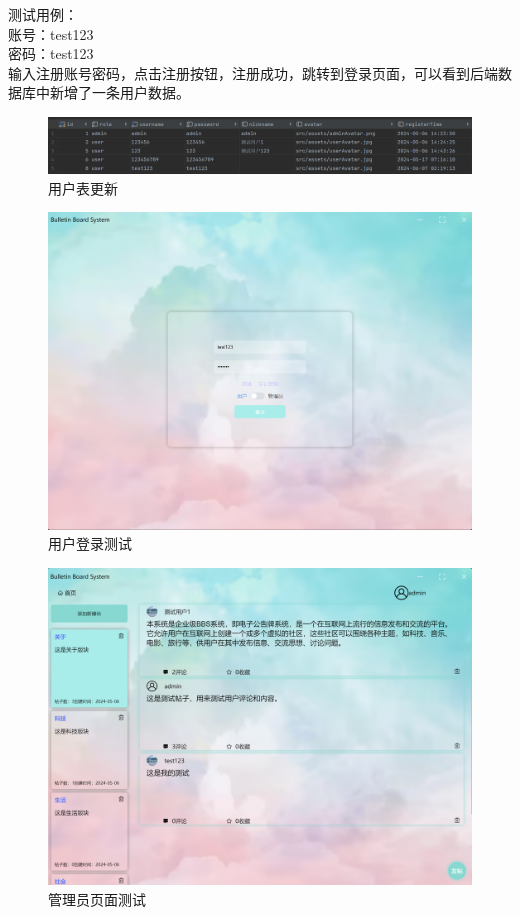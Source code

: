 \documentclass[UTF8]{ctexart}
\begin{document}
测试用例：\\
账号：test123\\
密码：test123\\

输入注册账号密码，点击注册按钮，注册成功，跳转到登录页面，可以看到后端数据库中新增了一条用户数据。

\begin{figure}[H]
  \centering
  \includegraphics[scale=0.3]{测试/用户表更新.png}
  \caption{用户表更新}
\end{figure}

\begin{figure}[H]
  \centering
  \includegraphics[scale=0.3]{测试/登录.png}
  \caption{用户登录测试}
\end{figure}

\begin{figure}[H]
  \centering
  \includegraphics[scale=0.3]{测试/管理员.png}
  \caption{管理员页面测试}
\end{figure}
\end{document}
